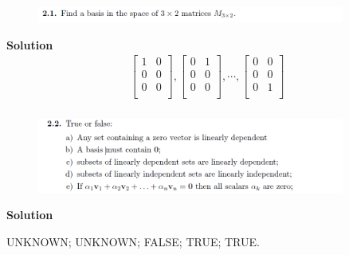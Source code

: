 \documentclass[cs4size,a4paper]{ctexart}
\numberwithin{equation}{section}
\numberwithin{table}{section}
\numberwithin{figure}{section}
\begin{document}
	\subsubsection{}
	\begin{figure}[H]
		\centering
		\includegraphics[width=0.9\textwidth]{1-2-1.png}
	\end{figure}
	\textbf{Solution}
	\begin{align}
		\left[ \begin{matrix}
			1&		0    \\
			0&		0    \\
			0&		0    \\
		\end{matrix} \right] 
		,
		\left[ \begin{matrix}
			0&		1    \\
			0&		0    \\
			0&		0    \\
		\end{matrix} \right] 
		,\cdots ,
		\left[ \begin{matrix}
			0&		0    \\
			0&		0    \\
			0&		1    \\
		\end{matrix} \right] 
	\end{align}
	\subsubsection{}
	\begin{figure}[H]
		\centering
		\includegraphics[width=0.9\textwidth]{1-2-2.png}
	\end{figure}
	\textbf{Solution}

	UNKNOWN; UNKNOWN; FALSE; TRUE; TRUE.
\end{document}

